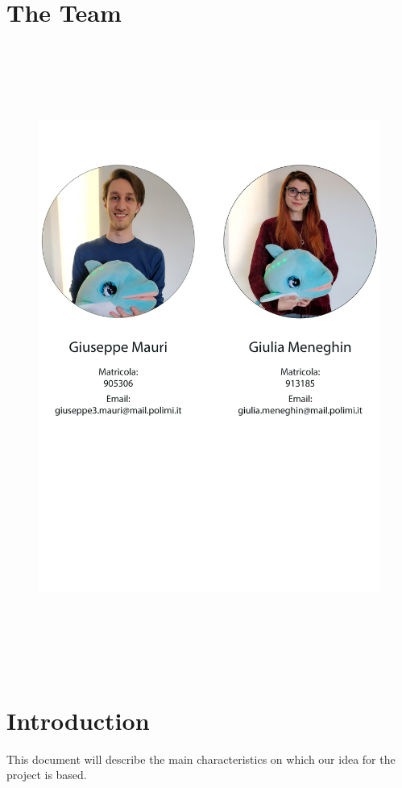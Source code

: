 \documentclass [12pt]{article}
\begin{document}
\section{The Team}
\begin{figure}[ht!]
\centering
\includegraphics[height=20.5cm,width=14.5cm]{Team.jpg}
\end{figure}
\clearpage


\tableofcontents

\section{Introduction}
This document will describe the main characteristics on which our idea for the project is based.
\end{document}
